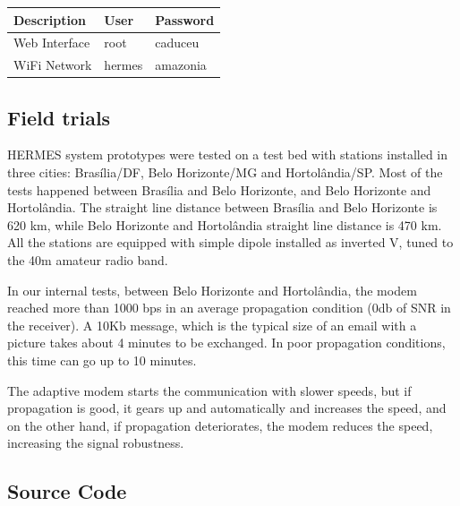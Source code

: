 \documentclass[11pt,a4paper]{article}
\begin{document}

\begin{table}[h]

\centering
\begin{tabular}{|l|l|l|}
\hline
Description & User & Password  \\ \hline
Web Interface & root  & caduceu \\  \hline
WiFi Network & hermes & amazonia \\ \hline
\end{tabular}
\end{table}

\subsection{Field trials}
\label{apx_field_trials}
    HERMES system prototypes were tested on a test bed with stations installed in three cities: Brasília/DF, Belo Horizonte/MG and Hortolândia/SP. Most of the tests happened between Brasília and Belo Horizonte, and Belo Horizonte and Hortolândia. The straight line distance between Brasília and Belo Horizonte is 620 km, while Belo Horizonte and Hortolândia straight line distance is 470 km. All the stations are equipped with simple dipole installed as inverted V, tuned to the 40m amateur radio band.

    In our internal tests, between Belo Horizonte and Hortolândia, the modem reached more than 1000 bps in an average propagation condition (0db of SNR in the receiver). A 10Kb message, which is the typical size of an email with a picture takes about 4 minutes to be exchanged. In poor propagation conditions, this time can go up to 10 minutes. 

    The adaptive modem starts the communication with slower speeds, but if propagation is good, it gears up and automatically and increases the speed, and on the other hand, if propagation deteriorates, the modem reduces the speed, increasing the signal robustness.

\subsection{Source Code}
\label{apx_src}
\end{document}
